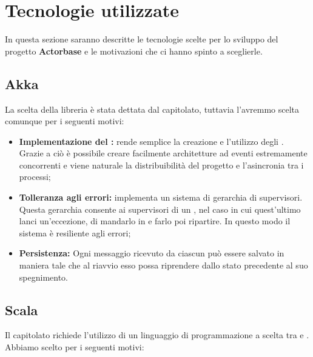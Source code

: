\documentclass{scalatekids-article}
\begin{document}
\newpage

\section{Tecnologie utilizzate}

In questa sezione saranno descritte le tecnologie scelte per lo sviluppo del
progetto \textbf{Actorbase} e le motivazioni che ci hanno spinto a sceglierle.

\subsection{Akka}

La scelta della libreria  è stata dettata dal capitolato, tuttavia
l'avremmo scelta comunque per i seguenti motivi:
\begin{itemize}
\item\textbf{Implementazione del :} 
  rende semplice la creazione e l'utilizzo degli . Grazie a ciò è
  possibile creare facilmente architetture ad eventi estremamente concorrenti e
  viene naturale la distribuibilità del progetto e l'asincronia tra i processi;
\item\textbf{Tolleranza agli errori:}  implementa un sistema di
  gerarchia di supervisori. Questa gerarchia consente ai supervisori di un
  , nel caso in cui quest'ultimo lanci un'eccezione, di mandarlo
  in  e farlo poi ripartire. In questo modo il sistema è resiliente
  agli errori;
\item\textbf{Persistenza:} Ogni messaggio ricevuto da ciascun 
  può essere salvato in maniera tale che al riavvio esso possa riprendere dallo
  stato precedente al suo spegnimento.
\end{itemize}

\subsection{Scala}

Il capitolato richiede l'utilizzo di un linguaggio di programmazione a scelta
tra  e . Abbiamo scelto  per i seguenti
motivi:
\end{document}
